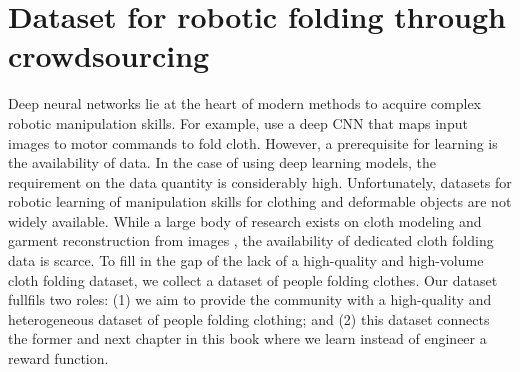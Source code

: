 \documentclass[\home/main.tex]{subfiles}
\begin{document}
\chapter{Dataset for robotic folding through crowdsourcing}\label{ch:data_collection}

Deep neural networks lie at the heart of modern methods to acquire complex robotic manipulation skills. For example, \textcite{Matas2018} use a deep \gls{CNN} that maps input images to motor commands to fold cloth. However, a prerequisite for learning is the availability of data. In the case of using deep learning models, the requirement on the data quantity is considerably high. 
Unfortunately, datasets for robotic learning of manipulation skills for clothing and deformable objects are not widely available. While a large body of research exists on cloth modeling and garment reconstruction from images \autocite{bertiche2020cloth3d,deepfashion3d,Wang20183dgarment}, the availability of dedicated cloth folding data is scarce. To fill in the gap of the lack of a high-quality and high-volume cloth folding dataset, we collect a dataset of people folding clothes. Our dataset fullfils two roles: (1) we aim to provide the community with a high-quality and heterogeneous dataset of people folding clothing; and (2) this dataset connects the former and next chapter in this book where we learn instead of engineer a reward function.


\end{document}
